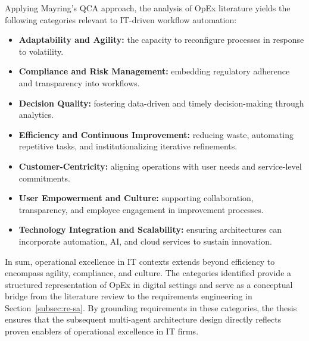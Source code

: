 Applying Mayring's QCA approach, the analysis of OpEx literature yields the following categories relevant to IT-driven workflow automation:
\begin{itemize}
    \item \textbf{Adaptability and Agility:} the capacity to reconfigure processes in response to volatility.
    \item \textbf{Compliance and Risk Management:} embedding regulatory adherence and transparency into workflows.
    \item \textbf{Decision Quality:} fostering data-driven and timely decision-making through analytics.
    \item \textbf{Efficiency and Continuous Improvement:} reducing waste, automating repetitive tasks, and institutionalizing iterative refinements.
    \item \textbf{Customer-Centricity:} aligning operations with user needs and service-level commitments.
    \item \textbf{User Empowerment and Culture:} supporting collaboration, transparency, and employee engagement in improvement processes.
    \item \textbf{Technology Integration and Scalability:} ensuring architectures can incorporate automation, AI, and cloud services to sustain innovation.
\end{itemize}

In sum, operational excellence in IT contexts extends beyond efficiency to encompass agility, compliance, and culture. The categories identified provide a structured representation of OpEx in digital settings and serve as a conceptual bridge from the literature review to the requirements engineering in Section~\ref{subsec:re-sa}. By grounding requirements in these categories, the thesis ensures that the subsequent multi-agent architecture design directly reflects proven enablers of operational excellence in IT firms.

